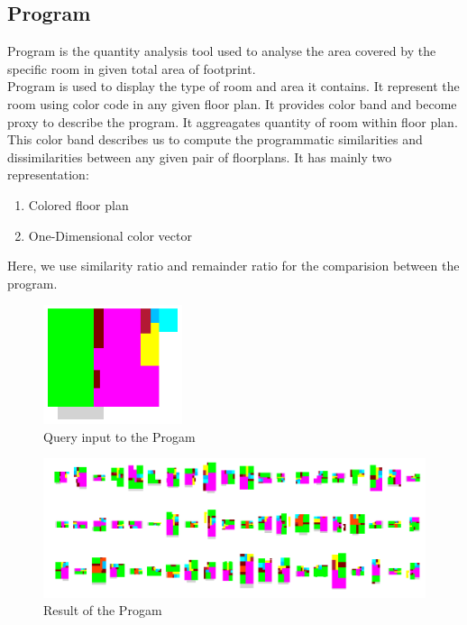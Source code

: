                 \subsection{Program}
                        Program is the quantity analysis tool used to analyse the area covered by the specific room in given total area of footprint.\\
                        Program is used to display the type of room and area it contains. It represent the room using color code in any given floor plan. It provides color band and become proxy to describe the program. It aggreagates quantity of room within floor plan. This color band describes us to compute the programmatic similarities and dissimilarities between any given pair of floorplans. It has mainly two representation:
                        \begin{enumerate}[label=\alph*.]
                                \item Colored floor plan 
                                \item One-Dimensional color vector
                        \end{enumerate}
                        Here, we use similarity ratio and remainder ratio for the comparision between the program.
                        \pagebreak
                        \begin{figure}[h]
                                \centering
                                \includegraphics[width=1.6in]{img/chapter_6/program_query.png}
                                \caption{Query input to the Progam}
                                \label{fig: Query input to the Progam}
                        \end{figure}
                        \begin{figure}[h]
                                \centering
                                \includegraphics[width=1\textwidth]{img/chapter_6/program_generated_result.png}
                                \caption{Result of the Progam}
                                \label{fig: Result of the Progam}
                        \end{figure}
